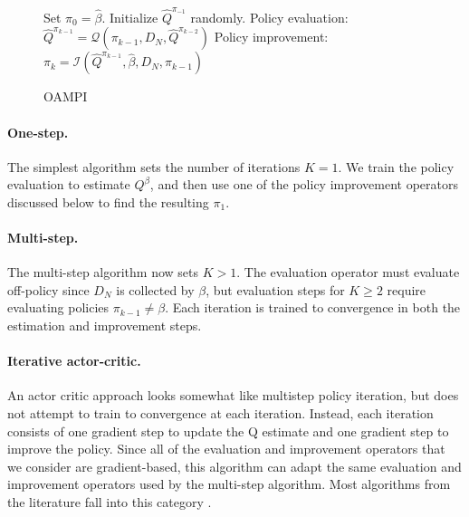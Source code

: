 \begin{figure}[h]
\vspace{-0.5cm}
\begin{algorithm}[H]
    \caption{OAMPI} \label{alg:oapi}
    \begin{algorithmic}[1]
             \State Set $\pi_0 = \hat \beta$. Initialize $ \widehat Q^{\pi_{-1}}$ randomly.
                \State Policy evaluation: $ \widehat Q^{\pi_{k-1}} = \mathcal{Q}(\pi_{k-1}, D_N, \widehat Q^{\pi_{k-2}})$
                \State Policy improvement: $ \pi_{k} = \mathcal{I}(\widehat Q^{\pi_{k-1}}, \hat \beta, D_N, \pi_{k-1})$
             \EndFor
        \end{algorithmic}
    \end{algorithm}
\end{figure}



\paragraph{One-step.}
The simplest algorithm sets the number of iterations $ K = 1$. We train the policy evaluation to estimate $ Q^\beta$, and then use one of the policy improvement operators discussed below to find the resulting $ \pi_1$.


\paragraph{Multi-step.}
The multi-step algorithm now sets $ K >1$. The evaluation operator must evaluate off-policy since $ D_N$ is collected by $ \beta$, but evaluation steps for $ K \geq 2$ require evaluating policies $ \pi_{k-1}\neq \beta$. Each iteration is trained to convergence in both the estimation and improvement steps.

\paragraph{Iterative actor-critic.}

An actor critic approach looks somewhat like multistep policy iteration, but does not attempt to train to convergence at each iteration. Instead, each iteration consists of one gradient step to update the Q estimate and one gradient step to improve the policy. Since all of the evaluation and improvement operators that we consider are gradient-based, this algorithm can adapt the same evaluation and improvement operators used by the multi-step algorithm. Most algorithms from the literature fall into this category \citep{fujimoto2018off, kumar2019stabilizing, kumar2020conservative, wu2019behavior,  wang2020critic, Siegel2020Keep}.


